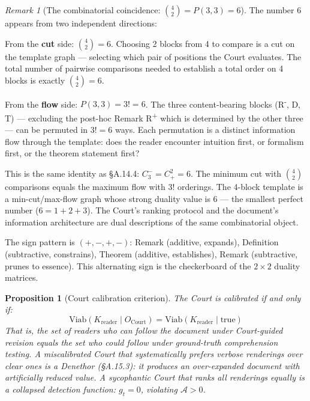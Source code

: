 \documentclass[11pt,a4paper]{article}
\newtheorem{proposition}[theorem]{Proposition}
\theoremstyle{definition}
\theoremstyle{remark}
\newtheorem{remark}[theorem]{Remark}
\newcommand{\Viab}{\mathrm{Viab}}
\begin{document}
\begin{remark}[The combinatorial coincidence: $\binom{4}{2} = P(3,3) = 6$]\label{rem:six}
The number 6 appears from two independent directions:

From the \textbf{cut} side: $\binom{4}{2} = 6$. Choosing 2 blocks from 4 to compare is a cut on the template graph --- selecting which pair of positions the Court evaluates. The total number of pairwise comparisons needed to establish a total order on 4 blocks is exactly $\binom{4}{2} = 6$.

From the \textbf{flow} side: $P(3,3) = 3! = 6$. The three content-bearing blocks (R\textsuperscript{-}, D, T) --- excluding the post-hoc Remark R\textsuperscript{+} which is determined by the other three --- can be permuted in $3! = 6$ ways. Each permutation is a distinct information flow through the template: does the reader encounter intuition first, or formalism first, or the theorem statement first?

This is the same identity as \S A.14.4: $C_3^- = C_+^2 = 6$. The minimum cut with $\binom{4}{2}$ comparisons equals the maximum flow with $3!$ orderings. The 4-block template is a min-cut/max-flow graph whose strong duality value is 6 --- the smallest perfect number ($6 = 1 + 2 + 3$). The Court's ranking protocol and the document's information architecture are dual descriptions of the same combinatorial object.

The sign pattern is $(+, -, +, -)$: Remark (additive, expands), Definition (subtractive, constrains), Theorem (additive, establishes), Remark (subtractive, prunes to essence). This alternating sign is the checkerboard of the $2 \times 2$ duality matrices.
\end{remark}

\begin{proposition}[Court calibration criterion]\label{prop:court_cal}
The Court is calibrated if and only if:
\[
  \Viab(K_{\mathrm{reader}} \mid O_{\mathrm{Court}}) = \Viab(K_{\mathrm{reader}} \mid \mathrm{true})
\]
That is, the set of readers who can follow the document under Court-guided revision equals the set who could follow under ground-truth comprehension testing. A miscalibrated Court that systematically prefers verbose renderings over clear ones is a Denethor (\S A.15.3): it produces an over-expanded document with artificially reduced value. A sycophantic Court that ranks all renderings equally is a collapsed detection function: $g_t = 0$, violating $\mathcal{A} > 0$.
\end{proposition}
\end{document}
